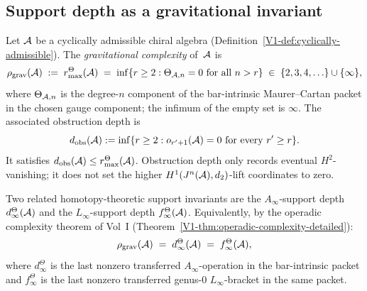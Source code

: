 
\subsection{Support depth as a gravitational invariant}

\begin{definition}
Let $\mathcal{A}$ be a cyclically admissible chiral algebra
(Definition~\ref{V1-def:cyclically-admissible}).
The \emph{gravitational complexity} of~$\mathcal{A}$ is
\begin{equation}%
\rho_{\mathrm{grav}}(\cA)
\;:=\;
r^\Theta_{\max}(\cA)
\;=\;
\inf\{r \geq 2 : \Theta_{\cA,n}=0\ \text{for all}\ n>r\}
\;\in\;
\{2, 3, 4, \ldots\} \cup \{\infty\},
\end{equation}
where \(\Theta_{\mathcal{A},n}\) is the degree-\(n\) component of the
bar-intrinsic Maurer--Cartan packet in the chosen gauge component;
the infimum of the empty set is \(\infty\).
The associated obstruction depth is
\[
d_{\mathrm{obs}}(\mathcal{A}):=
\inf\{r\ge2:o_{r'+1}(\mathcal{A})=0\ \text{for every}\ r'\ge r\}.
\]
It satisfies \(d_{\mathrm{obs}}(\mathcal{A})\le r^\Theta_{\max}(\mathcal{A})\).
Obstruction depth only records eventual \(H^2\)-vanishing; it does
not set the higher \(H^1(J^n(\mathcal{A}),d_2)\)-lift coordinates to zero.

Two related homotopy-theoretic support invariants are the
\(A_\infty\)-support depth \(d^\Theta_\infty(\mathcal{A})\) and the
\(L_\infty\)-support depth \(f^\Theta_\infty(\mathcal{A})\).
Equivalently, by the operadic complexity theorem of Vol~I
\textup{(}Theorem~\textup{\ref*{V1-thm:operadic-complexity-detailed}}\textup{)}:
\begin{equation}%
\rho_{\mathrm{grav}}(\cA)
\;=\;
d^\Theta_\infty(\cA)
\;=\;
f^\Theta_\infty(\cA),
\end{equation}
where \(d^\Theta_\infty\) is the last nonzero transferred
\(A_\infty\)-operation in the bar-intrinsic packet and
\(f^\Theta_\infty\) is the last nonzero transferred genus-$0$
\(L_\infty\)-bracket in the same packet.
\end{definition}

